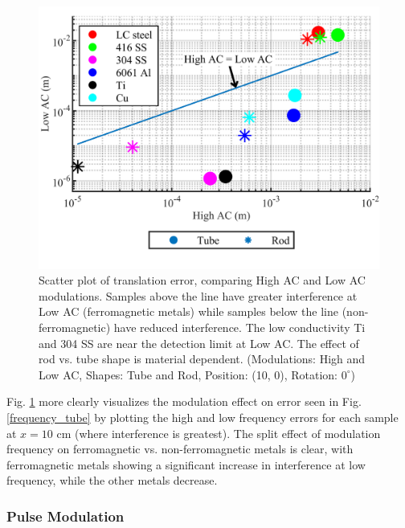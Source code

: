 \documentclass[journal,twoside,web]{ieeecolor}
\begin{document}
\begin{figure}[!tb]
\centerline{\includegraphics[width=\columnwidth]{chaic10.png}}
\caption{Scatter plot of translation error, comparing High AC and Low AC modulations. Samples above the line have greater interference at Low AC (ferromagnetic metals) while samples below the line (non-ferromagnetic) have reduced interference. The low conductivity Ti and 304 SS are near the detection limit at Low AC. The effect of rod vs. tube shape is material dependent.
(Modulations: High and Low AC, Shapes: Tube and Rod, Position: (10, 0), Rotation: $0^\circ$)}
\label{HighLow_compare}
\end{figure}

Fig. \ref{HighLow_compare} more clearly visualizes the modulation effect on error seen in Fig. \ref{frequency_tube} by plotting the high and low frequency errors for each sample at $x=10$ cm (where interference is greatest). The split effect of modulation frequency on ferromagnetic vs. non-ferromagnetic metals is clear, with ferromagnetic metals showing a significant increase in interference at low frequency, while the other metals decrease. 



\subsubsection{Pulse Modulation}
\end{document}
